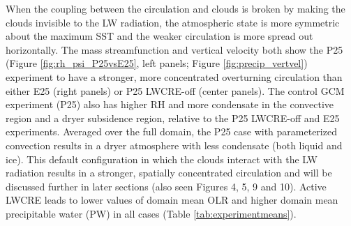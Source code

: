 \documentclass[draft]{agujournal2019}
\begin{document}
When the coupling between the circulation and clouds is broken by making the clouds invisible to the 
LW radiation, the atmospheric state is more symmetric about the maximum SST and the weaker circulation
is more spread out horizontally.   The mass streamfunction and vertical velocity both show the 
P25 (Figure \ref{fig:rh_psi_P25vsE25}, left panels; Figure \ref{fig:precip_vertvel}) experiment to have 
a stronger, more concentrated overturning circulation than either E25 (right panels) or P25 LWCRE-off (center panels).   
The control GCM experiment (P25) also has higher RH and more condensate in the convective
region and a dryer subsidence region, relative to the P25 LWCRE-off and E25 experiments. 
Averaged over the full domain, the P25 case with parameterized convection results in a dryer atmosphere with less condensate (both liquid and ice). 
This default configuration in which the clouds interact with the LW radiation results in a stronger,
spatially concentrated circulation and will be discussed further in later sections (also seen Figures 4, 5, 9 and 10).
Active LWCRE leads to lower values of domain mean OLR and higher domain mean precipitable water (PW) in all cases (Table \ref{tab:experimentmeans}). 
\end{document}
